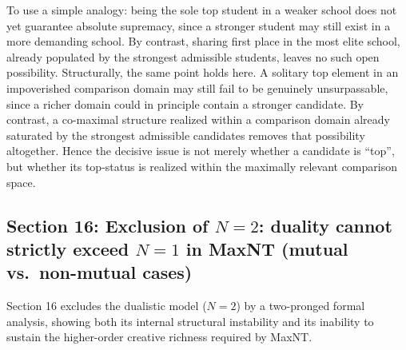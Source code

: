 \documentclass[a4paper, 11pt]{article}
\theoremstyle{plain}
\theoremstyle{definition}
\begin{document}
To use a simple analogy: being the sole top student in a weaker school does not yet guarantee absolute supremacy, since a stronger student may still exist in a more demanding school. By contrast, sharing first place in the most elite school, already populated by the strongest admissible students, leaves no such open possibility. Structurally, the same point holds here. A solitary top element in an impoverished comparison domain may still fail to be genuinely unsurpassable, since a richer domain could in principle contain a stronger candidate. By contrast, a co-maximal structure realized within a comparison domain already saturated by the strongest admissible candidates removes that possibility altogether. Hence the decisive issue is not merely whether a candidate is ``top'', but whether its top-status is realized within the maximally relevant comparison space.

\subsection{Section 16: Exclusion of \(N=2\): duality cannot strictly exceed \(N=1\) in MaxNT (mutual vs.\ non-mutual cases)}
\label{sec:paircollapse}

Section 16 excludes the dualistic model (\(N=2\)) by a two-pronged formal analysis, showing both its internal structural instability and its inability to sustain the higher-order creative richness required by MaxNT.
\end{document}
